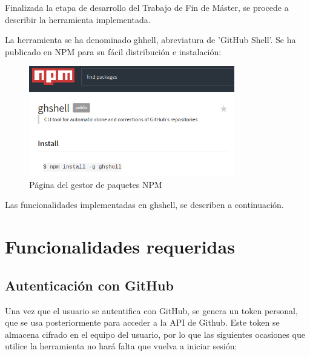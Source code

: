 

Finalizada la etapa de desarrollo del Trabajo de Fin de Máster, se procede a describir la herramienta implementada.


La herramienta se ha denominado ghhell, abreviatura de 'GitHub Shell'. Se ha publicado en NPM\cite{NPM} para su fácil distribución e instalación:

\begin{figure}[H]
\begin{center}
\includegraphics[width=0.8\textwidth]{images/npm1}
\caption{Página del gestor de paquetes NPM}
\label{fig:npm}
\end{center}
\end{figure}

Las funcionalidades implementadas en ghshell, se describen a continuación.

\section{Funcionalidades requeridas}
\label{3:sec:1}

\subsection{Autenticación con GitHub}
\label{subsec:3.1.1}
    
    Una vez que el usuario se autentifica con GitHub, se genera un token personal, que se usa posteriormente para acceder a la API de Github. Este token se almacena cifrado en el equipo del usuario, por lo que las siguientes ocasiones que utilice la herramienta no hará falta que vuelva a iniciar sesión:
        
